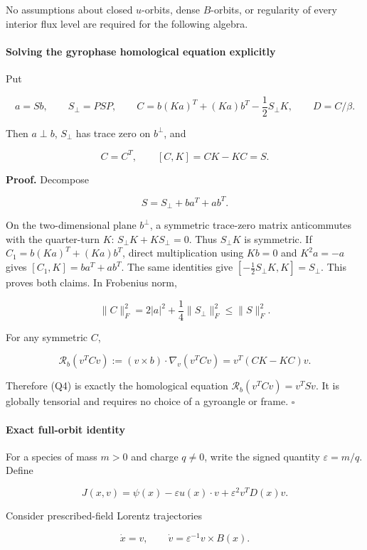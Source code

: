 No assumptions about closed \(u\)-orbits, dense \(B\)-orbits, or
regularity of every interior flux level are required for the following
algebra.

\paragraph{Solving the gyrophase homological equation
explicitly}\label{solving-the-gyrophase-homological-equation-explicitly}

Put

\[
a=Sb,\qquad S_\perp=PSP,\qquad
C=b(Ka)^T+(Ka)b^T-\frac12S_\perp K,\qquad D=C/\beta.
\tag{Q3}
\]

Then \(a\perp b\), \(S_\perp\) has trace zero on \(b^\perp\), and

\[
C=C^T,\qquad [C,K]=CK-KC=S.
\tag{Q4}
\]

\textbf{Proof.} Decompose

\[
S=S_\perp+ba^T+ab^T.
\]

On the two-dimensional plane \(b^\perp\), a symmetric trace-zero matrix
anticommutes with the quarter-turn \(K\): \(S_\perp K+KS_\perp=0\). Thus
\(S_\perp K\) is symmetric. If \(C_1=b(Ka)^T+(Ka)b^T\), direct
multiplication using \(Kb=0\) and \(K^2a=-a\) gives
\([C_1,K]=ba^T+ab^T\). The same identities give
\([-\frac12S_\perp K,K]=S_\perp\). This proves both claims. In Frobenius
norm,

\[
\|C\|_F^2=2|a|^2+\frac14\|S_\perp\|_F^2
\le \|S\|_F^2.
\]

For any symmetric \(C\),

\[
\mathcal R_b(v^TCv)
:=(v\times b)\cdot\nabla_v(v^TCv)
=v^T(CK-KC)v.
\]

Therefore (Q4) is exactly the homological equation
\(\mathcal R_b(v^TCv)=v^TSv\). It is globally tensorial and requires no
choice of a gyroangle or frame. \(\square\)

\paragraph{Exact full-orbit
identity}\label{exact-full-orbit-identity}

For a species of mass \(m>0\) and charge \(q\ne0\), write the signed
quantity \(\varepsilon=m/q\). Define

\[
J(x,v)=\psi(x)-\varepsilon u(x)\cdot v
               +\varepsilon^2v^TD(x)v.
\tag{Q5}
\]

Consider prescribed-field Lorentz trajectories

\[
\dot x=v,\qquad
\dot v=\varepsilon^{-1}v\times B(x).
\tag{Q6}
\]

